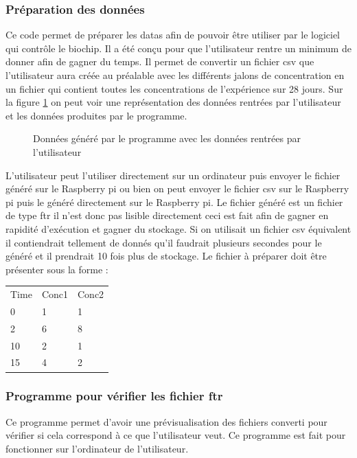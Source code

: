 \documentclass[a4paper, 11pt]{article}
\begin{document}
\subsubsection{Préparation des données}
Ce code permet de préparer les datas afin de pouvoir être utiliser par le logiciel qui contrôle le biochip.
Il a été conçu pour que l'utilisateur rentre un minimum de donner afin de gagner du temps.
Il permet de convertir un fichier csv que l'utilisateur aura créée au préalable avec les différents jalons de concentration en un fichier qui contient toutes les concentrations de l'expérience sur 28 jours.
Sur la figure \ref{fig:dataPreparation} on peut voir une représentation des données rentrées par l'utilisateur et les données produites par le programme.
\begin{figure}[H]
    \centering
    \caption{Données généré par le programme avec les données rentrées par l'utilisateur}
    \label{fig:dataPreparation}
\end{figure}
L'utilisateur peut l'utiliser directement sur un ordinateur puis envoyer le fichier généré sur le Raspberry pi ou bien on peut envoyer le fichier csv sur le Raspberry pi puis le généré directement sur le Raspberry pi.
Le fichier généré est un fichier de type ftr il n'est donc pas lisible directement ceci est fait afin de gagner en rapidité d'exécution et gagner du stockage.
Si on utilisait un fichier csv équivalent il contiendrait tellement de donnés qu'il faudrait plusieurs secondes pour le généré et il prendrait 10 fois plus de stockage.
Le fichier à préparer doit être présenter sous la forme :
\begin{table}[H]
    \centering
    \begin{tabular}{lll}
        Time & Conc1 & Conc2 \\
        0    & 1     & 1     \\
        2    & 6     & 8     \\
        10   & 2     & 1     \\
        15   & 4     & 2
    \end{tabular}
\end{table}
\subsubsection{Programme pour vérifier les fichier ftr}
Ce programme permet d'avoir une prévisualisation des fichiers converti pour vérifier si cela correspond à ce que l'utilisateur veut. Ce programme est fait pour fonctionner sur l'ordinateur de l'utilisateur.
\end{document}

